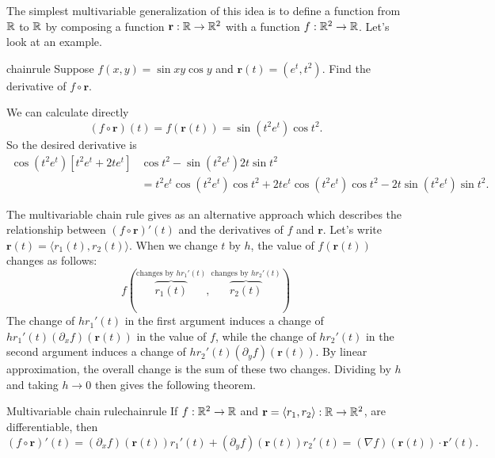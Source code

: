 \documentclass{watsonbook}
\begin{document}
  The simplest multivariable generalization of this idea is to define a
  function from $\mathbb{R}$ to $\mathbb{R}$ by composing a function $\mathbf{r}: \mathbb{R}
  \to \mathbb{R}^2$
  with a function $f: \mathbb{R}^2 \to \mathbb{R}$. Let's look at an example.

  \begin{example}{}{chainrule}
    Suppose $f(x,y) = \sin xy \cos y$ and $\mathbf{r}(t) = (e^t,
    t^2)$. Find the derivative of $f \circ \mathbf{r}$. 
  \end{example}

  \begin{solution}
    We can calculate directly
    \[
      (f \circ \mathbf{r})(t) = f(\mathbf{r}(t)) = \sin (t^2e^t) \cos
      t^2. 
    \]
    So the desired derivative is
    \begin{align*}
      \cos(t^2e^t)\left[ t^2 e^t + 2te^t\right] &\cos t^2  -
      \sin(t^2 e^t) 2t \sin t^2  \\ &=
      t^2 e^t \cos(t^2 e^t) \cos t^2 + 2te^t \cos(t^2 e^t) \cos t^2 -
      2t\sin(t^2 e^t) \sin t^2. 
    \end{align*}
  \end{solution}

  The multivariable chain rule gives as an alternative approach which
  describes the relationship between $(f\circ \mathbf{r})'(t)$ and the
  derivatives of $f$ and $\mathbf{r}$. Let's write
  $\mathbf{r}(t) = \langle r_1(t), r_2(t) \rangle$.  When we change
  $t$ by $h$, the value of $f(\mathbf{r}(t))$ changes as follows: 
  \[
    f\left(
      \overbrace{r_1(t)}^{\text{changes by $hr_1'(t)$}},
      \overbrace{r_2(t)}^{\text{changes by $hr_2'(t)$}}
    \right)
  \]
  The change of $hr_1'(t)$ in the first argument induces a change of
  $hr_1'(t) (\partial_xf)(\mathbf{r}(t))$ in the value of $f$, while
  the change of $hr_2'(t)$ in the second argument induces a change of
  $hr_2'(t) (\partial_yf)(\mathbf{r}(t))$. By linear approximation,
  the overall change is the sum of these two changes. Dividing by $h$
  and taking $h \to 0$ then gives the following theorem.
  
  \begin{theo}{Multivariable chain rule}{chainrule}
    If $f : \mathbb{R}^2 \to \mathbb{R}$ and $\mathbf{r} = \langle r_1,  r_2\rangle :
    \mathbb{R} \to \mathbb{R}^2$,
    are differentiable, then
    \begin{equation} \label{eq:chainrule} 
      (f\circ \mathbf{r})'(t) = (\partial_x f)(\mathbf{r}(t))r_1'(t) +
      (\partial_y f)(\mathbf{r}(t))r_2'(t) = (\nabla f)(\mathbf{r}(t))
      \cdot \mathbf{r}'(t). 
    \end{equation}
  \end{theo}
\end{document}
